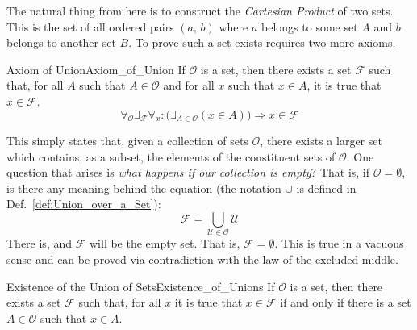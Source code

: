         The natural thing from here is to construct the
        \textit{Cartesian Product} of two sets. This is
        the set of all ordered pairs $(a,\,b)$ where $a$
        belongs to some set $A$ and $b$ belongs to another set $B$. To prove
        such a set exists requires two more axioms.
        \begin{faxiom}{Axiom of Union}{Axiom_of_Union}
            If $\mathcal{O}$ is a set, then there exists a set $\mathcal{F}$
            such that, for all $A$ such that $A\in\mathcal{O}$ and for all
            $x$ such that $x\in{A}$, it is true that $x\in\mathcal{F}$.%
            \begin{equation*}
                \forall_{\mathcal{O}}\exists_{\mathcal{F}}\forall_{x}:
                \big(\exists_{A\in\mathcal{O}}(x\in{A})\big)
                \Rightarrow{x}\in\mathcal{F}
            \end{equation*}
        \end{faxiom}
        This simply states that, given a collection of sets $\mathcal{O}$,
        there exists a larger set which contains, as a subset, the elements
        of the constituent sets of $\mathcal{O}$. One question that arises is
        \textit{what happens if our collection is empty}? That is, if
        $\mathcal{O}=\emptyset$, is there any meaning behind the equation
        (the notation $\cup$ is defined in Def.~\ref{def:Union_over_a_Set}):
        \begin{equation}
            \mathcal{F}=\bigcup_{\mathcal{U}\in\mathcal{O}}\mathcal{U}
        \end{equation}
        There is, and $\mathcal{F}$ will be the empty set. That is,
        $\mathcal{F}=\emptyset$. This is true in a vacuous sense and can be
        proved via contradiction with the law of the excluded middle.
        \begin{ltheorem}{Existence of the Union of Sets}{Existence_of_Unions}
            If $\mathcal{O}$ is a set, then there exists a set $\mathcal{F}$
            such that, for all $x$ it is true that $x\in\mathcal{F}$ if and
            only if there is a set $A\in\mathcal{O}$ such that $x\in{A}$.
        \end{ltheorem}
